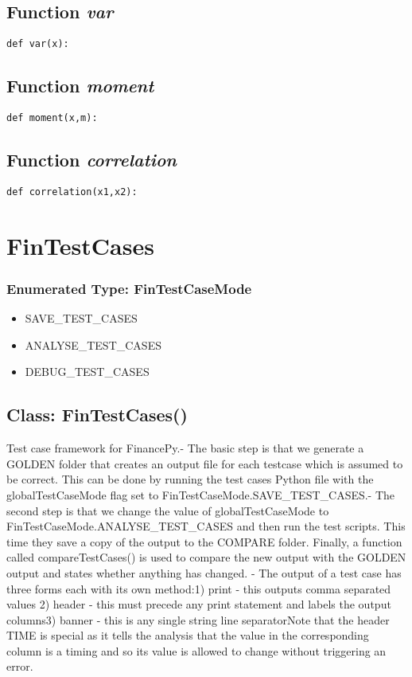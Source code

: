 \documentclass[twoside,11pt]{book}
\begin{document}
\subsection{Function {\it var}}


\begin{lstlisting}
def var(x):
\end{lstlisting}

\subsection{Function {\it moment}}


\begin{lstlisting}
def moment(x,m):
\end{lstlisting}

\subsection{Function {\it correlation}}


\begin{lstlisting}
def correlation(x1,x2):
\end{lstlisting}

\newpage
\section{FinTestCases}

\subsubsection{Enumerated Type: FinTestCaseMode}
\begin{itemize}
\item{SAVE\_TEST\_CASES}
\item{ANALYSE\_TEST\_CASES}
\item{DEBUG\_TEST\_CASES}
\end{itemize}

\subsection{Class: FinTestCases()}
Test case framework for FinancePy.- The basic step is that we generate a GOLDEN folder that creates an output file for each testcase which is assumed to be correct. This can be done by running the test cases Python file with the globalTestCaseMode flag set to FinTestCaseMode.SAVE\_TEST\_CASES.- The second step is that we change the value of globalTestCaseMode to FinTestCaseMode.ANALYSE\_TEST\_CASES and then run the test scripts. This time they save a copy of the output to the COMPARE folder. Finally, a function called compareTestCases() is used to compare the new output with the GOLDEN output and states whether anything has changed. - The output of a test case has three forms each with its own method:1) print - this outputs comma separated values 2) header - this must precede any print statement and labels the output columns3) banner - this is any single string line separatorNote that the header TIME is special as it tells the analysis that the value in the corresponding column is a timing and so its value is allowed to change without triggering an error. 
\end{document}
